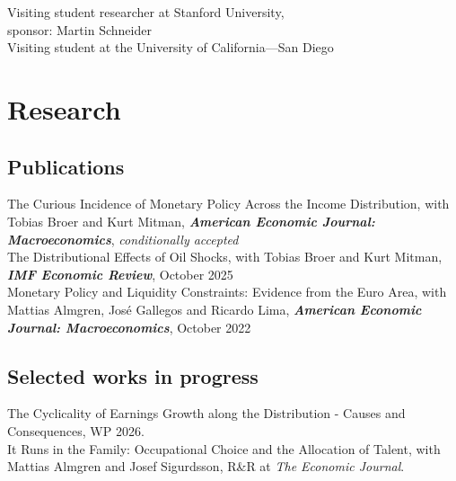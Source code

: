 \documentclass[11pt]{article} %
\begin{document}
 Visiting student researcher at Stanford University, \\
sponsor: Martin Schneider \\
 Visiting student at the University of California---San Diego





\section*{Research}

\subsection*{Publications}

The Curious Incidence of Monetary Policy Across the Income Distribution, with Tobias Broer and Kurt Mitman, \textbf{\textit{American Economic Journal: Macroeconomics}}, \textit{conditionally accepted} \\

The Distributional Effects of Oil Shocks, with Tobias Broer and Kurt Mitman, \textbf{\textit{IMF Economic Review}}, October 2025 \\

Monetary Policy and Liquidity Constraints: Evidence from the Euro Area, with Mattias Almgren, Jos\'e Gallegos and Ricardo Lima, \textbf{\textit{American Economic Journal: Macroeconomics}}, October 2022 



\subsection*{Selected works in progress}

The Cyclicality of Earnings Growth along the Distribution - Causes and Consequences, WP 2026. \\

It Runs in the Family: Occupational Choice and the Allocation of Talent, with Mattias Almgren and Josef Sigurdsson, R\&R at \textit{The Economic Journal}. \\
\end{document}
